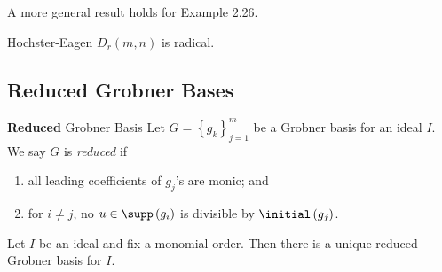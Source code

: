 \documentclass[co439]{subfiles}
\begin{document}
    \rruleline

    \np A more general result holds for Example 2.26.

    \begin{theorem}{Hochster-Eagen}
        $D_r\left( m,n \right)$ is radical.
    \end{theorem}

    \rruleline

    \subsection{Reduced Grobner Bases}
    
    \begin{definition}{\textbf{Reduced} Grobner Basis}
        Let $G = \left\lbrace g_k \right\rbrace^{m}_{j=1}$ be a Grobner basis for an ideal $I$. We say $G$ is \emph{reduced} if
        \begin{enumerate}
            \item all leading coefficients of $g_j$'s are monic; and
            \item for $i\neq j$, no $u\in\supp\left( g_i \right)$ is divisible by $\initial\left( g_j \right)$.
        \end{enumerate}
    \end{definition} 
    
    \begin{theorem}{}
        Let $I$ be an ideal and fix a monomial order. Then there is a unique reduced Grobner basis for $I$.
    \end{theorem}
    
\end{document}
